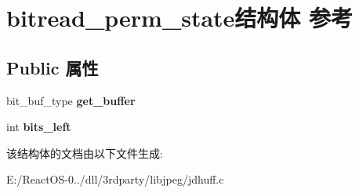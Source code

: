 \hypertarget{structbitread__perm__state}{}\section{bitread\+\_\+perm\+\_\+state结构体 参考}
\label{structbitread__perm__state}
\subsection*{Public 属性}
\begin{DoxyCompactItemize}
\item 
\mbox{\label{structbitread__perm__state_a39dce6ef08822b3ae5c8ba2329d079bd}} 
bit\+\_\+buf\+\_\+type {\bfseries get\+\_\+buffer}
\item 
\mbox{\label{structbitread__perm__state_ac138b781f4681902dec2e44007f672c4}} 
int {\bfseries bits\+\_\+left}
\end{DoxyCompactItemize}


该结构体的文档由以下文件生成\+:\begin{DoxyCompactItemize}
\item 
E\+:/\+React\+O\+S-\/0../dll/3rdparty/libjpeg/jdhuff.\+c\end{DoxyCompactItemize}
